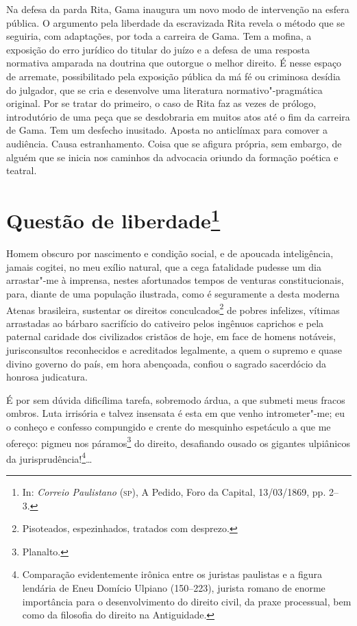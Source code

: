 \@openrighttrue\makeatother \endgroup

\paginabranca
\mbox{}\vfill
\thispagestyle{empty}

{\small\noindent
Na defesa da parda Rita, Gama inaugura um novo modo de intervenção
na esfera pública. O argumento pela liberdade da escravizada Rita revela
o método que se seguiria, com adaptações, por toda a carreira de Gama.
Tem a mofina, a exposição do erro jurídico do titular do juízo e a
defesa de uma resposta normativa amparada na doutrina que outorgue o
melhor direito. É nesse espaço de arremate, possibilitado
pela exposição pública da má fé ou criminosa desídia do julgador, que se
cria e desenvolve uma literatura normativo"-pragmática original. Por se
tratar do primeiro, o caso de Rita faz as vezes de prólogo, introdutório
de uma peça que se desdobraria em muitos atos até o fim da carreira de
Gama. Tem um desfecho inusitado. Aposta no anticlímax para comover a
audiência. Causa estranhamento. Coisa que se afigura própria, sem
embargo, de alguém que se inicia nos caminhos da advocacia oriundo da
formação poética e teatral. }

\chapter{Questão de liberdade\footnote[*]{In: \emph{Correio
  Paulistano} (\textsc{sp}), A Pedido, Foro da Capital, 13/03/1869, pp. 2--3.}}

Homem obscuro por nascimento e condição social, e de apoucada
inteligência, jamais cogitei, no meu exílio natural, que a cega
fatalidade pudesse um dia arrastar"-me à imprensa, nestes afortunados
tempos de venturas constitucionais, para, diante de uma população
ilustrada, como é seguramente a desta moderna Atenas brasileira,
sustentar os direitos conculcados\footnote{Pisoteados, espezinhados,
  tratados com desprezo.} de pobres infelizes, vítimas arrastadas ao
bárbaro sacrifício do cativeiro pelos ingênuos caprichos e pela paternal
caridade dos civilizados cristãos de hoje, em face de homens notáveis,
jurisconsultos reconhecidos e acreditados legalmente, a quem o supremo e
quase divino governo do país, em hora abençoada, confiou o sagrado
sacerdócio da honrosa judicatura.

É por sem dúvida dificílima tarefa, sobremodo árdua, a que submeti meus
fracos ombros. Luta irrisória e talvez insensata é esta em que venho
intrometer"-me; eu o conheço e confesso compungido e crente do mesquinho
espetáculo a que me ofereço: pigmeu nos páramos\footnote{Planalto.} do
direito, desafiando ousado os gigantes ulpiânicos da
jurisprudência!\footnote{Comparação evidentemente irônica entre os
  juristas paulistas e a figura lendária de Eneu Domício Ulpiano
  (150--223), jurista romano de enorme importância para o desenvolvimento
  do direito civil, da praxe processual, bem como da filosofia do
  direito na Antiguidade.}\ldots{}

